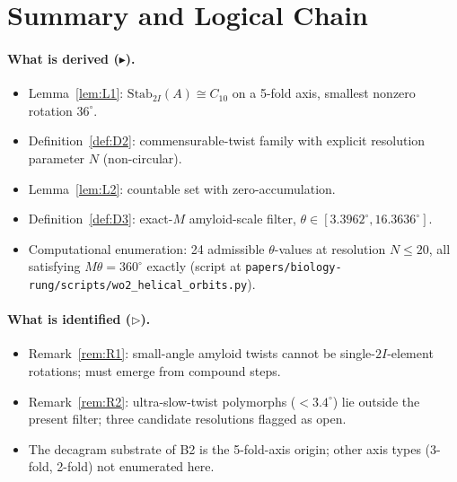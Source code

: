 \documentclass[12pt]{article}
\newcommand{\Stab}{\mathrm{Stab}}
\begin{document}
\section{Summary and Logical Chain}\label{sec:chain}

\paragraph{What is derived ($\blacktriangleright$).}
\begin{itemize}
\item Lemma~\ref{lem:L1}: $\Stab_{2I}(A) \cong C_{10}$ on a
  5-fold axis, smallest nonzero rotation $36^{\circ}$.
\item Definition~\ref{def:D2}: commensurable-twist family with
  explicit resolution parameter $N$ (non-circular).
\item Lemma~\ref{lem:L2}: countable set with zero-accumulation.
\item Definition~\ref{def:D3}: exact-$M$ amyloid-scale filter,
  $\theta \in [3.3962^{\circ}, 16.3636^{\circ}]$.
\item Computational enumeration: 24 admissible $\theta$-values
  at resolution $N \le 20$, all satisfying $M\theta = 360^{\circ}$
  exactly (script at
  \texttt{papers/biology-rung/scripts/wo2\_helical\_orbits.py}).
\end{itemize}

\paragraph{What is identified ($\triangleright$).}
\begin{itemize}
\item Remark~\ref{rem:R1}: small-angle amyloid twists cannot be
  single-$2I$-element rotations; must emerge from compound steps.
\item Remark~\ref{rem:R2}: ultra-slow-twist polymorphs
  ($< 3.4^{\circ}$) lie outside the present filter; three
  candidate resolutions flagged as open.
\item The decagram substrate of B2 \cite[\S 5.1]{CascadeBio} is
  the 5-fold-axis origin; other axis types (3-fold, 2-fold) not
  enumerated here.
\end{itemize}
\end{document}
